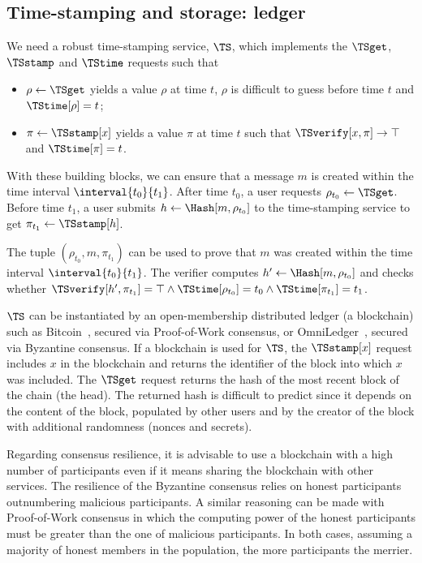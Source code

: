 \subsection{Time-stamping and storage: ledger}%
\label{StorageProperties}\label{timestamp}\label{ledger}

We need a robust time-stamping service, \(\TS\), which implements the \(\TSget\), \(\TSstamp\) and \(\TStime\) requests such that
\begin{itemize}
  \item \(\rho \gets \TSget\) yields a value \(\rho\) at time \(t\), \(\rho\) is difficult to guess before time \(t\) and \(\TStime[\rho] = t\);
  \item \(\pi\gets \TSstamp[x]\) yields a value \(\pi\) at time \(t\) such that \(\TSverify[x, \pi]\to \top\) and \(\TStime[\pi] = t\).
\end{itemize}

With these building blocks, we can ensure that a message \(m\) is created within the time interval \(\interval{t_0}{t_1}\).
After time \(t_0\), a user requests \(\rho_{t_0}\gets \TSget\).
Before time \(t_1\), a user submits \(h\gets \Hash[m, \rho_{t_0}]\) to the time-stamping service to get \(\pi_{t_1}\gets \TSstamp[h]\).

The tuple \((\rho_{t_0}, m, \pi_{t_1})\) can be used to prove that \(m\) was created within the time interval \(\interval{t_0}{t_1}\).
The verifier computes \(h'\gets \Hash[m, \rho_{t_0}]\) and checks whether \(\TSverify[h', \pi_{t_1}] = \top \land \TStime[\rho_{t_0}] = t_0\land 
  \TStime[\pi_{t_1}] = t_1\).

\(\TS\) can be instantiated by an open-membership distributed ledger (\eg a blockchain) such as Bitcoin~\cite{Bitcoin}, secured via Proof-of-Work consensus, or OmniLedger~\cite{OmniLedger}, secured via Byzantine consensus.
If a blockchain is used for \(\TS\), the \(\TSstamp[x]\) request includes \(x\) in the blockchain and returns the identifier of the block into which \(x\) was included.
The \(\TSget\) request returns the hash of the most recent block of the chain (\ie the head).
The returned hash is difficult to predict since it depends on the content of the block, populated by other users and by the creator of the block with additional randomness (\eg nonces and secrets).

Regarding consensus resilience, it is advisable to use a blockchain with a high number of participants even if it means sharing the blockchain with other services.
The resilience of the Byzantine consensus relies on honest participants outnumbering malicious participants.
A similar reasoning can be made with Proof-of-Work consensus in which the computing power of the honest participants must be greater than the one of malicious participants.
In both cases, assuming a majority of honest members in the population, the more participants the merrier.

